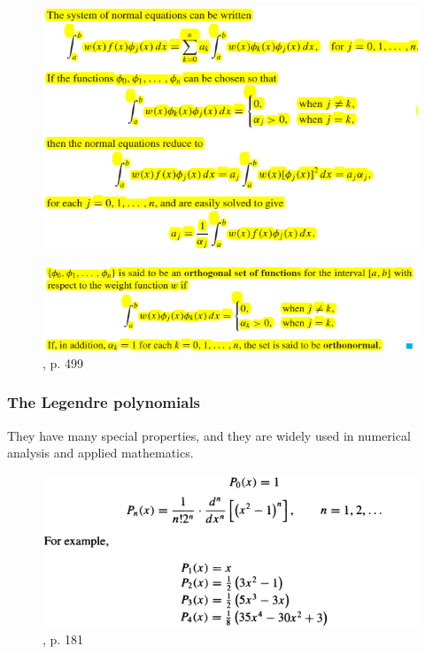 \documentclass[12pt]{article}
\theoremstyle{theorem}
\begin{document}
\begin{figure}[h!]
	\centering
	\includegraphics[scale = 0.8]{Figures/37}
	\label{fig:37}
\end{figure}

\begin{figure}[h!]
	\centering
	\includegraphics[scale = 0.8]{Figures/36}
	\caption{\cite{BurF10}, p. 499}
	\label{fig:36}
\end{figure}

\subsubsection{The Legendre polynomials} They have many special properties, and they are widely used in numerical analysis and applied mathematics. 

\begin{figure}[h!]
	\centering
	\includegraphics[scale = 0.8]{Figures/38}
	\caption{\cite{AtkH03}, p. 181}
	\label{fig:38}
\end{figure}
\end{document}
